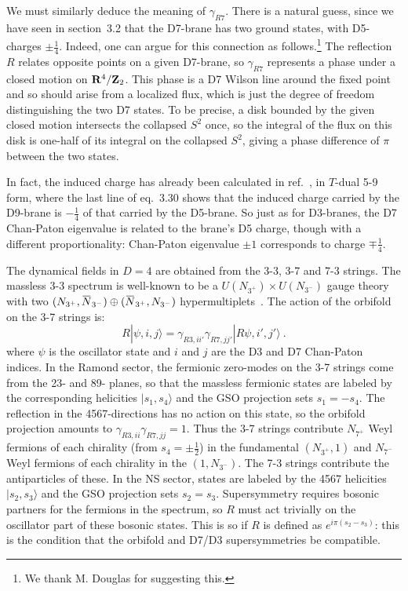 \documentclass[a4paper,12pt]{article}
\renewcommand{\=}[1]{\bar{#1}}
\newcommand{\OL}[1]{ \hspace{1pt}\overline{\hspace{-1pt}#1
   \hspace{-1pt}}\hspace{1pt} }
\begin{document}
We must similarly deduce the meaning of $\gamma_{R7}$.  There is a natural
guess, since we have seen in section~3.2 that the D7-brane has two
ground states, with D5-charges $\pm \frac{1}{4}$.  Indeed, one can argue for
this connection as follows.\footnote{We thank M. Douglas for suggesting this.}
The reflection $R$ relates opposite points on a given D7-brane, so
$\gamma_{R7}$ represents a phase under a closed motion on ${\bf R}^4/{\bf
Z}_2$. This phase is a D7 Wilson line around the fixed point and so should
arise from a localized flux, which is just the degree of freedom
distinguishing the two D7 states.  To be precise, a disk bounded by the given
closed motion intersects the collapsed $S^2$ once, so the integral of the
flux on this disk is one-half of its integral on the collapsed $S^2$, giving
a phase difference of $\pi$ between the two states.  

In fact, the induced charge
has already been calculated in ref.~\cite{gimpol}, in
$T$-dual 5-9 form, where the last line of eq.~3.30 shows that the induced
charge carried by the D9-brane is $-\frac{1}{4}$ of that carried by the
D5-brane.  So just as for D3-branes, the
D7 Chan-Paton eigenvalue is related to the brane's D5 charge, though with a
different proportionality: Chan-Paton eigenvalue $\pm 1$ corresponds to charge
$\mp \frac{1}{4}$.

The dynamical fields in $D=4$ are obtained from the 3-3, 3-7 and 7-3 strings.
The massless 3-3 spectrum is well-known to be a $U(N_{3^+}) \times
U(N_{3^-})$ gauge theory with two $({ N}_{3^+},\OL{{
N}}_{3^-})\oplus(\OL{{ N}}_{3^+}, { N}_{3^-})$
hypermultiplets~\cite{quiver,GK-KN}.  The action of the  orbifold on
the 3-7 strings is:
\begin{equation}
R|\psi,i,j
\rangle=\gamma_{R3,i i'}\gamma_{R7,jj'}|R\psi,i',j'\rangle\ .
\end{equation}
where $\psi$ is the oscillator state and $i$ and $j$ are the D3 and D7
Chan-Paton indices.
In the Ramond sector, the fermionic zero-modes on the 3-7 strings come from
the 23- and 89- planes, so that the massless fermionic states are
labeled by the  corresponding helicities $|s_1,s_4\rangle$ and the GSO
projection sets $s_1=-s_4$.  The reflection in the 4567-directions has no
action on this state, so the orbifold projection amounts to
$\gamma_{R3,i i}\gamma_{R7,jj} = 1$.  Thus the 3-7 strings contribute
$N_{7^+}$ Weyl fermions of each chirality (from $s_{4} = \pm \frac12$) in
the fundamental $(N_{3^+},1)$ and $N_{7^-}$ Weyl
fermions of each chirality in the
$(1,N_{3^-})$.  The 7-3 strings contribute the antiparticles of
these.  In the NS sector,  states are labeled by the 4567 helicities
$|s_2,s_3\rangle$ and the GSO projection sets $s_2=s_3$.
Supersymmetry requires bosonic partners for the fermions in the
spectrum, so
$R$ must act trivially on the oscillator part of these bosonic states.  This
is so if $R$ is defined as $e^{i\pi(s_2-s_3)}$: this is the condition that
the orbifold and D7/D3 supersymmetries be compatible.
\end{document}
